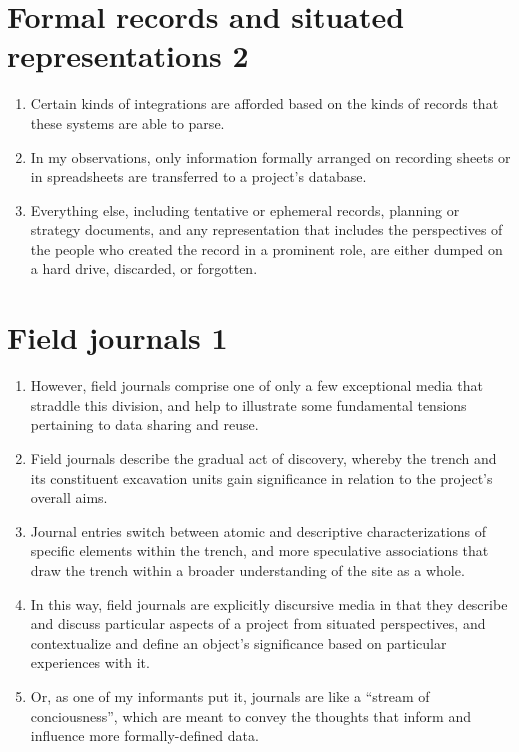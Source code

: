 \documentclass[12pt]{article}
\begin{document}
\section{Formal records and situated representations 2}
\begin{enumerate}
  \item Certain kinds of integrations are afforded based on the kinds of records that these systems are able to parse.
  \item In my observations, only information formally arranged on recording sheets or in spreadsheets are transferred to a project's database.
  \item Everything else, including tentative or ephemeral records, planning or strategy documents, and any representation that includes the perspectives of the people who created the record in a prominent role, are either dumped on a hard drive, discarded, or forgotten.
\end{enumerate}

\section{Field journals 1}
\begin{enumerate}
  \item However, field journals comprise one of only a few exceptional media that straddle this division, and help to illustrate some fundamental tensions pertaining to data sharing and reuse.
  \item Field journals describe the gradual act of discovery, whereby the trench and its constituent excavation units gain significance in relation to the project's overall aims.
  \item Journal entries switch between atomic and descriptive characterizations of specific elements within the trench, and more speculative associations that draw the trench within a broader understanding of the site as a whole.
  \item In this way, field journals are explicitly discursive media in that they describe and discuss particular aspects of a project from situated perspectives, and contextualize and define an object's significance based on particular experiences with it.
  \item Or, as one of my informants put it, journals are like a ``stream of conciousness'', which are meant to convey the thoughts that inform and influence more formally-defined data.
\end{enumerate}
  
\end{document}
